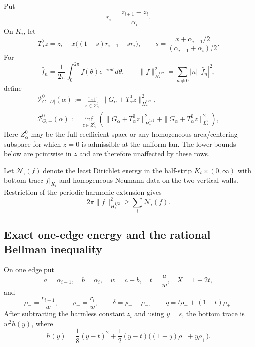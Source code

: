 \documentclass[11pt]{amsart}
\numberwithin{equation}{section}
\theoremstyle{definition}
\theoremstyle{remark}
\newcommand{\PGdot}{\mathcal P_{G,|D|}^0}
\newcommand{\PGplus}{\mathcal P_{G,+}^0}
\begin{document}
Put
\begin{equation}\label{H0:eq:r}
 r_i=\frac{z_{i+1}-z_i}{\alpha_i}.
\end{equation}
On $K_i$, let
\begin{equation}\label{H0:eq:T0}
 T_\alpha^0z
 =z_i+x\bigl((1-s)r_{i-1}+sr_i\bigr),
 \qquad
 s=\frac{x+\alpha_{i-1}/2}{(\alpha_{i-1}+\alpha_i)/2}.
\end{equation}
For
\begin{equation}
 \widehat f_n=\frac1{2\pi}\int_0^{2\pi}
 f(\theta)e^{-in\theta}\,d\theta,
 \qquad
 \|f\|_{\dot H_*^{1/2}}^2
 =\sum_{n\ne0}|n|\,|\widehat f_n|^2,
\end{equation}
define
\begin{align}
 \PGdot(\alpha)
 :=\inf_{z\in Z_\alpha^0}
 \|G_\alpha+T_\alpha^0z\|_{\dot H_*^{1/2}}^2,
 \label{H0:eq:PGdot}\\
 \PGplus(\alpha)
 :=\inf_{z\in Z_\alpha^0}\left(
 \|G_\alpha+T_\alpha^0z\|_{\dot H_*^{1/2}}^2
 +\|G_\alpha+T_\alpha^0z\|_{L_*^2}^2\right),
 \label{H0:eq:PGplus}
\end{align}
Here $Z_\alpha^0$ may be the full coefficient space or any homogeneous
area/centering subspace for which $z=0$ is admissible at the uniform fan.
The lower bounds below are pointwise in $z$ and are therefore unaffected by
these rows.

Let $\mathcal N_i(f)$ denote the least Dirichlet energy in the half-strip
$K_i\times(0,\infty)$ with bottom trace $f|_{K_i}$ and homogeneous Neumann
data on the two vertical walls.  Restriction of the periodic harmonic
extension gives
\begin{equation}\label{H0:eq:strip-localization}
 2\pi\|f\|_{\dot H_*^{1/2}}^2
 \ge\sum_i\mathcal N_i(f).
\end{equation}

\subsection{Exact one-edge energy and the rational Bellman inequality}

On one edge put
\begin{equation}\label{H0:eq:normalized-variables}
 a=\alpha_{i-1},\quad b=\alpha_i,\quad w=a+b,
 \quad t=\frac aw,\quad X=1-2t,
\end{equation}
and
\begin{equation}
 \rho_-=\frac{r_{i-1}}w,\qquad
 \rho_+=\frac{r_i}w,\qquad
 \delta=\rho_+-\rho_-,\qquad
 q=t\rho_-+(1-t)\rho_+.
\end{equation}
After subtracting the harmless constant $z_i$ and using $y=s$, the bottom
trace is $w^2h(y)$, where
\begin{equation}\label{H0:eq:h}
 h(y)=\frac18(y-t)^2
 +\frac12(y-t)\bigl((1-y)\rho_-+y\rho_+\bigr).
\end{equation}
\end{document}
